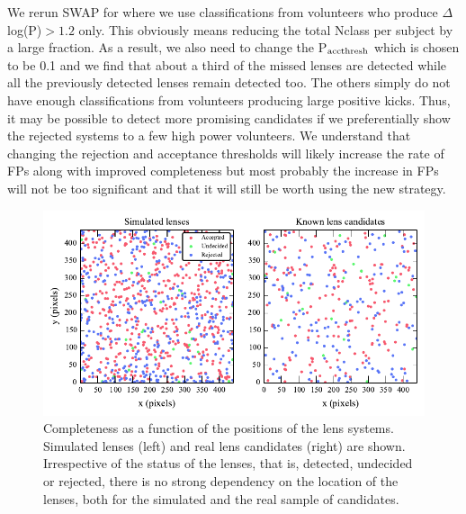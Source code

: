 \documentclass[useAMS,usenatbib,a4paper]{mn2e}
\begin{document}
We rerun SWAP for \StageOne where we use classifications from volunteers
who produce $\Delta$ log(P)$>1.2$ only. This obviously means reducing
the total Nclass per subject by a large fraction. As a result, we also
need to change the P$_{\rm acc thresh}$ which is chosen to be 0.1 and we
find that about a third of the missed lenses are detected while all the
previously detected lenses remain detected too. The others simply do not
have enough classifications from volunteers producing large positive
kicks. Thus, it may be possible to detect more promising candidates if
we preferentially show the rejected systems to a few high power
volunteers. We understand that changing the rejection and acceptance
thresholds will likely increase the rate of FPs along with
improved completeness but most probably the increase in FPs will not be
too significant and that it will still be worth using the new strategy.


\begin{figure}
\begin{center}
\includegraphics[scale=0.95]{sw-cfhtls-figs/completeness_pos.pdf}
\caption{ \label{fig:comppos}
Completeness as a function of the positions of the lens systems. Simulated lenses
(left) and real lens candidates (right) are shown. Irrespective of the
status of the lenses, that is, detected, undecided or rejected, there is
no strong dependency on the location of the lenses, both for the
simulated and the real sample of candidates. }
\end{center}
\end{figure}
\end{document}
